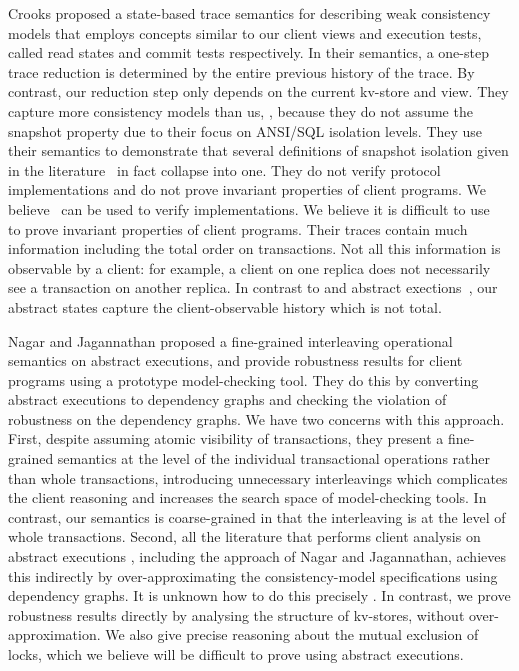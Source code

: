 Crooks \etal\citet{seebelieve} proposed a state-based trace
semantics for describing weak consistency models that employs concepts
similar to our client views and execution tests, called read states and
commit tests respectively.  In their semantics, a one-step trace
reduction is determined by the entire previous history of the trace.
By contrast, our reduction step only depends on the current kv-store
and view.  They capture more consistency models than us, , because they do not assume the snapshot property
due to their focus on ANSI/SQL isolation levels. They use their semantics to 
demonstrate that 
several definitions of snapshot isolation given in the
literature~\cite{si,lazy-si,geo-si} in fact collapse into one.  They do not verify
protocol implementations and do not prove invariant properties of
client programs.  We believe~\cite{seebelieve} can be used to verify
implementations. We believe it is difficult to use~\cite{seebelieve}
to prove invariant properties of client programs.  Their 
traces contain much information including \eg the total
order on transactions. Not all this information is  observable by a
client: for example,  a client on one replica does not necessarily see
a transaction on another replica. In contrast to \cite{seebelieve} and abstract
exections~\cite{ev_transactions,framework-concur},  our abstract
states  capture the  client-observable history
which is not total. 

Nagar and Jagannathan \cite{sureshConcur} proposed a fine-grained 
interleaving operational semantics on abstract executions, and provide
robustness results for client programs using 
a prototype model-checking tool. 
They do this by converting abstract executions to
dependency graphs and checking the violation of robustness on the
dependency graphs. We have two concerns with this approach.  First, despite 
assuming atomic visibility of transactions, they present a fine-grained
semantics at the level of the individual transactional operations
rather than whole transactions, introducing unnecessary interleavings
which complicates the client reasoning and increases  the
search space of model-checking tools. 
In contrast, our semantics is coarse-grained in that the  interleaving is at the level of whole
transactions. 
Second, all the literature that performs client analysis
on abstract executions
\cite{giovanni_concur16,SIanalysis,psi-chopping,laws,sureshConcur},
including the approach of Nagar and Jagannathan,  achieves this indirectly by over-approximating
the consistency-model specifications using dependency graphs. 
It is  unknown how to do this precisely \cite{laws}. 
In contrast, we prove robustness results directly by
analysing the structure of kv-stores, without over-approximation. 
We also give precise reasoning about the mutual exclusion of locks,
which we believe will be difficult to prove using abstract executions.

